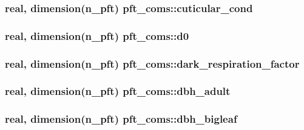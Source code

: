 \subsubsection[{\texorpdfstring{cuticular\+\_\+cond}{cuticular_cond}}]{\setlength{\rightskip}{0pt plus 5cm}real, dimension(n\+\_\+pft) pft\+\_\+coms\+::cuticular\+\_\+cond}\hypertarget{namespacepft__coms_a123da989ae706b508ed48db4a138ff8e}{}\label{namespacepft__coms_a123da989ae706b508ed48db4a138ff8e}
\subsubsection[{\texorpdfstring{d0}{d0}}]{\setlength{\rightskip}{0pt plus 5cm}real, dimension(n\+\_\+pft) pft\+\_\+coms\+::d0}\hypertarget{namespacepft__coms_aafd962aec98e7e8c1cfefd6543409bd5}{}\label{namespacepft__coms_aafd962aec98e7e8c1cfefd6543409bd5}
\subsubsection[{\texorpdfstring{dark\+\_\+respiration\+\_\+factor}{dark_respiration_factor}}]{\setlength{\rightskip}{0pt plus 5cm}real, dimension(n\+\_\+pft) pft\+\_\+coms\+::dark\+\_\+respiration\+\_\+factor}\hypertarget{namespacepft__coms_acd493e3e4371571956c651698a6462b9}{}\label{namespacepft__coms_acd493e3e4371571956c651698a6462b9}
\subsubsection[{\texorpdfstring{dbh\+\_\+adult}{dbh_adult}}]{\setlength{\rightskip}{0pt plus 5cm}real, dimension(n\+\_\+pft) pft\+\_\+coms\+::dbh\+\_\+adult}\hypertarget{namespacepft__coms_a5dbaccf1767dc343b4dca7f5e25f358b}{}\label{namespacepft__coms_a5dbaccf1767dc343b4dca7f5e25f358b}
\subsubsection[{\texorpdfstring{dbh\+\_\+bigleaf}{dbh_bigleaf}}]{\setlength{\rightskip}{0pt plus 5cm}real, dimension(n\+\_\+pft) pft\+\_\+coms\+::dbh\+\_\+bigleaf}\hypertarget{namespacepft__coms_a86747c6ee955a89a55612d189bf255f8}{}\label{namespacepft__coms_a86747c6ee955a89a55612d189bf255f8}
